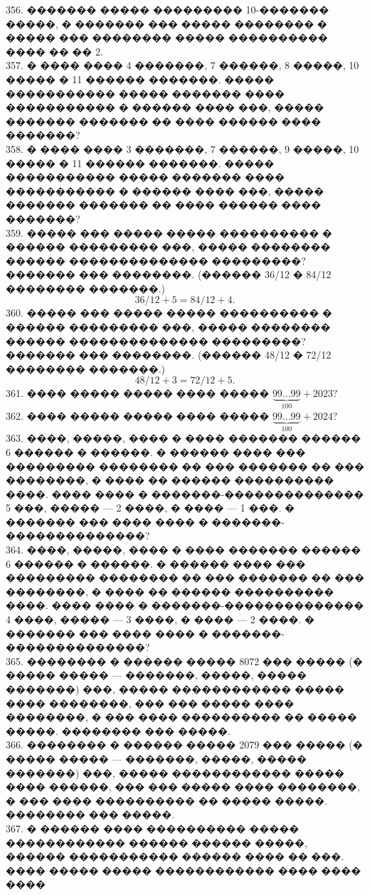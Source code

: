 \documentclass[12pt]{article}
\begin{document}
356. ������� ����� ��������� 10-������� �����, � ������� ��� ����� �������� � ����� ��� �������� ����� ���������� ���� �� �� 2.\\
357. � ���� ���� 4 �������, 7 ������, 8 �����, 10 ����� � 11 ������ �������. ����� ����������� ����� ������� ���� ����������� � ������ ���� ���, ����� ������� ������� �� ���� ������ ���� �������?\\
358. � ���� ���� 3 �������, 7 ������, 9 �����, 10 ����� � 11 ������ �������. ����� ����������� ����� ������� ���� ����������� � ������ ���� ���, ����� ������� ������� �� ���� ������ ���� �������?\\
359. ����� ��� ����� ����� ���������� � ������ ��������� ���, ����� �������� ������ �������������� ���������? ������� ��� ��������. (������ 36/12 � 84/12 �������� �������.)
$$ 36/12+5=84/12+4.$$
360. ����� ��� ����� ����� ���������� � ������ ��������� ���, ����� �������� ������ �������������� ���������? ������� ��� ��������. (������ 48/12 � 72/12 �������� �������.)
$$48/12+3=72/12+5.$$
361. ���� ����� ����� ���� ����� $\underbrace{99\ldots99}_{100}+2023?$\\
362. ���� ����� ����� ���� ����� $\underbrace{99\ldots99}_{100}+2024?$\\
363. ����, �����, ���� � ���� ������� ������ 6 ������ � ������. � ������ ���� ��� ��������� �������� �� ��� ������� �� ��� ��������, � ���� �� ������ ���������� ����. ���� ���� � �������-�������������� 5 ���, ����� --- 2 ����, � ���� --- 1 ���. � ������� ��� ���� ���� � �������-��������������?\\
364. ����, �����, ���� � ���� ������� ������ 6 ������ � ������. � ������ ���� ��� ��������� �������� �� ��� ������� �� ��� ��������, � ���� �� ������ ���������� ����. ���� ���� � �������-�������������� 4 ����, ����� --- 3 ����, � ���� --- 2 ����. � ������� ��� ���� ���� � �������-��������������?\\
365. �������� � ������ ����� 8072 ��� ����� (� ����� ����� --- �������, �����, ����� �������) ���, ����� ������������ ����� ���� ��������, ��� ��� ����� ���� ��������, � ��� ���� ���������� �� ����� �����. �������� ��� �����.\\
366. �������� � ������ ����� 2079 ��� ����� (� ����� ����� --- �������, �����, ����� �������) ���, ����� ������������ ����� ���� ������, ��� ��� ����� ���� ��������, � ��� ���� ���������� �� ����� �����. �������� ��� �����.\\
367. � ������ ���� ���������� ����� ������������ ������ ������ �����, ������ ����������� ������ ���� �� ���. ���� ����� ����� ������������ ���� ���� ����
\end{document}
